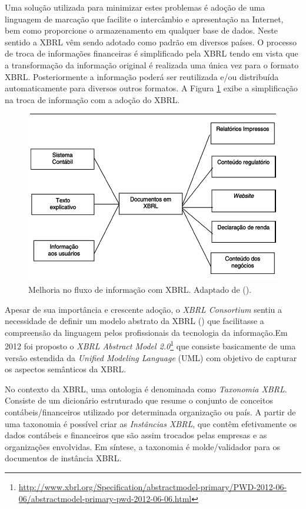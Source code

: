 \documentclass[msc,proposal,hidelot,hideabstract]{ppgccufmg} %
\begin{document}
Uma solução utilizada para minimizar estes problemas é adoção de uma linguagem de marcação que facilite o intercâmbio e apresentação na Internet, bem como proporcione o armazenamento em qualquer base de dados. Neste sentido a XBRL vêm sendo adotado como padrão em diversos países. O processo de troca de informações financeiras é simplificado pela XBRL tendo em vista que a transformação da informação original é realizada uma única vez para o formato XBRL. Posteriormente a informação poderá ser reutilizada e/ou distribuída automaticamente para diversos outros formatos. A Figura \ref{fig:fluxo_info_xbrl} exibe a simplificação na troca de informação com a adoção do XBRL.

\begin{figure}[hbtp]
\centering
\includegraphics[width=.75\textwidth]{img/fluxo_info_xbrl.png}
\caption{Melhoria no fluxo de informação com XBRL. Adaptado de (\cite{hoffman2001xbrl}).}
\label{fig:fluxo_info_xbrl}
\end{figure}

Apesar de sua importância e crescente adoção, o \textit{XBRL Consortium} sentiu a necessidade de definir um modelo abstrato da XBRL (\cite{xbrl_preserve_promote_particite}) que facilitasse a compreensão da linguagem pelos profissionais da tecnologia da informação.Em 2012 foi proposto o \textit{XBRL Abstract Model 2.0}\footnote{\url{http://www.xbrl.org/Specification/abstractmodel-primary/PWD-2012-06-06/abstractmodel-primary-pwd-2012-06-06.html}} que consiste basicamente de uma versão estendida da \textit{Unified Modeling Language} (UML)\cite{booch2000uml} com objetivo de capturar os aspectos semânticos da XBRL.

No contexto da XBRL, uma ontologia é denominada como \textit{Taxonomia XBRL}{}. Consiste de um dicionário estruturado que resume o conjunto de conceitos contábeis/financeiros utilizado por determinada organização ou país. A partir de uma taxonomia é possível criar as \textit{Instâncias XBRL}, que contêm efetivamente os dados contábeis e financeiros que são assim trocados pelas empresas e as organizações envolvidas. Em síntese, a taxonomia é molde/validador para os documentos de instância XBRL.
\end{document}
